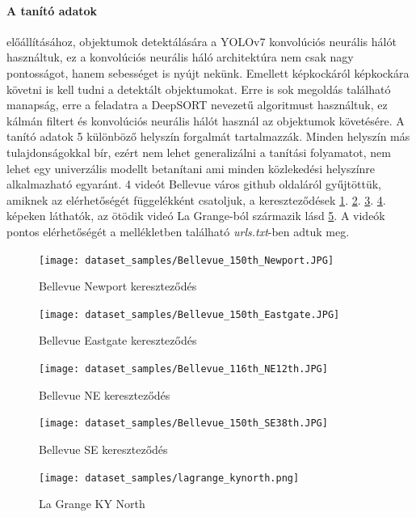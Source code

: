 \documentclass[12pt,a4paper]{article}
\begin{document}

\paragraph{A tanító adatok} előállításához, objektumok detektálására a YOLOv7 \cite{wang2022yolov7} konvolúciós neurális hálót használtuk, ez a konvolúciós neurális háló architektúra nem csak nagy pontosságot, hanem sebességet is nyújt nekünk.
Emellett képkockáról képkockára követni is kell tudni a detektált objektumokat. Erre is sok megoldás található manapság, erre a feladatra
a DeepSORT \cite{Wojke2018deep} nevezetű algoritmust használtuk, ez kálmán filtert és konvolúciós neurális hálót használ az objektumok követésére.
A tanító adatok 5 különböző helyszín forgalmát tartalmazzák. Minden helyszín más tulajdonságokkal bír, ezért nem lehet generalizálni
a tanítási folyamatot, nem lehet egy univerzális modellt betanítani ami minden közlekedési helyszínre alkalmazható egyaránt.
4 videót Bellevue város github oldaláról gyűjtöttük, amiknek az elérhetőségét függelékként csatoljuk, a kereszteződések
\ref{fig: BellevueNewport}. \ref{fig: BellevueEastgate}. \ref{fig: BellevueNE}. \ref{fig: BellevueSE}. képeken láthatók, az ötödik videó La Grange-ból származik lásd \ref{lagrangekynorth}. A videók pontos elérhetőségét
a mellékletben található \emph{urls.txt}-ben adtuk meg.
\begin{figure}
    \texttt{[image: dataset\_samples/Bellevue\_150th\_Newport.JPG]}
    \caption{Bellevue Newport kereszteződés}
    \label{fig: BellevueNewport}
\end{figure}
\begin{figure}
    \texttt{[image: dataset\_samples/Bellevue\_150th\_Eastgate.JPG]}
    \caption{Bellevue Eastgate kereszteződés}
    \label{fig: BellevueEastgate}
\end{figure}
\begin{figure}
    \texttt{[image: dataset\_samples/Bellevue\_116th\_NE12th.JPG]}
    \caption{Bellevue NE kereszteződés}
    \label{fig: BellevueNE}
\end{figure}
\begin{figure}
    \texttt{[image: dataset\_samples/Bellevue\_150th\_SE38th.JPG]}
    \caption{Bellevue SE kereszteződés}
    \label{fig: BellevueSE}
\end{figure}
\begin{figure}
    \texttt{[image: dataset\_samples/lagrange\_kynorth.png]}
    \caption{La Grange KY North}
    \label{lagrangekynorth}
\end{figure}
\end{document}
